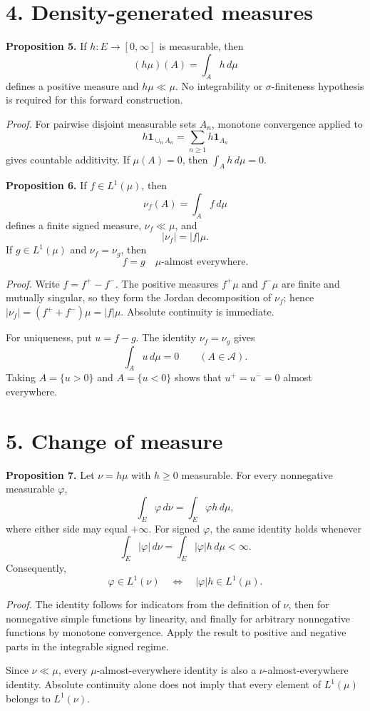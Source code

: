 \section*{4. Density-generated measures}

\textbf{Proposition 5.}
If $h:E\to[0,\infty]$ is measurable, then
\[
(h\mu)(A)=\int_Ah\,d\mu
\]
defines a positive measure and $h\mu\ll\mu$. No integrability or $\sigma$-finiteness hypothesis is required for this forward construction.

\textit{Proof.}
For pairwise disjoint measurable sets $A_n$, monotone convergence applied to
\[
h\mathbf 1_{\cup_n A_n}
=
\sum_{n\ge1}h\mathbf 1_{A_n}
\]
gives countable additivity. If $\mu(A)=0$, then $\int_Ah\,d\mu=0$.

\textbf{Proposition 6.}
If $f\in L^1(\mu)$, then
\[
\nu_f(A)=\int_Af\,d\mu
\]
defines a finite signed measure, $\nu_f\ll\mu$, and
\[
|\nu_f|=|f|\mu.
\]
If $g\in L^1(\mu)$ and $\nu_f=\nu_g$, then
\[
f=g\quad\mu\text{-almost everywhere}.
\]

\textit{Proof.}
Write $f=f^+-f^-$. The positive measures $f^+\mu$ and $f^-\mu$ are finite and mutually singular, so they form the Jordan decomposition of $\nu_f$; hence $|\nu_f|=(f^++f^-)\mu=|f|\mu$. Absolute continuity is immediate.

For uniqueness, put $u=f-g$. The identity $\nu_f=\nu_g$ gives
\[
\int_Au\,d\mu=0
\qquad(A\in\mathcal A).
\]
Taking $A=\{u>0\}$ and $A=\{u<0\}$ shows that $u^+=u^-=0$ almost everywhere.

\section*{5. Change of measure}

\textbf{Proposition 7.}
Let $\nu=h\mu$ with $h\ge0$ measurable. For every nonnegative measurable $\varphi$,
\[
\int_E\varphi\,d\nu
=
\int_E\varphi h\,d\mu,
\]
where either side may equal $+\infty$. For signed $\varphi$, the same identity holds whenever
\[
\int_E|\varphi|\,d\nu
=
\int_E|\varphi|h\,d\mu
<\infty.
\]
Consequently,
\[
\varphi\in L^1(\nu)
\quad\Longleftrightarrow\quad
|\varphi|h\in L^1(\mu).
\]

\textit{Proof.}
The identity follows for indicators from the definition of $\nu$, then for nonnegative simple functions by linearity, and finally for arbitrary nonnegative functions by monotone convergence. Apply the result to positive and negative parts in the integrable signed regime.

Since $\nu\ll\mu$, every $\mu$-almost-everywhere identity is also a $\nu$-almost-everywhere identity. Absolute continuity alone does not imply that every element of $L^1(\mu)$ belongs to $L^1(\nu)$.

